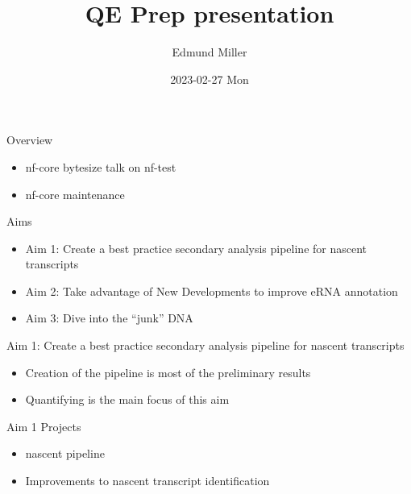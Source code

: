 \documentclass[bigger]{beamer}
\author{Edmund Miller}
\date{2023-02-27 Mon}
\title{QE Prep presentation}
\begin{document}
\maketitle



\begin{frame}[label={sec:orgeb4b0a5}]{Overview}
\begin{itemize}
\item nf-core bytesize talk on nf-test
\end{itemize}

\begin{itemize}
\item nf-core maintenance
\end{itemize}
\end{frame}


\begin{frame}[label={sec:orgf92e554}]{Aims}
\begin{itemize}
\item Aim 1: Create a best practice secondary analysis pipeline for nascent transcripts
\item Aim 2: Take advantage of New Developments to improve eRNA annotation
\item Aim 3: Dive into the ``junk'' DNA
\end{itemize}
\end{frame}


\begin{frame}[label={sec:orgc8c8e4e}]{Aim 1: Create a best practice secondary analysis pipeline for nascent transcripts}
\begin{itemize}
\item Creation of the pipeline is most of the preliminary results
\item Quantifying is the main focus of this aim
\end{itemize}
\end{frame}


\begin{frame}[label={sec:orgcfed8a5}]{Aim 1 Projects}
\begin{itemize}
\item nascent pipeline
\item Improvements to nascent transcript identification
\end{itemize}
\end{frame}
\end{document}
